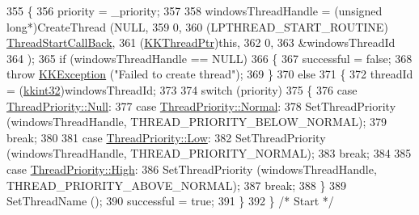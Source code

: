 \begin{DoxyCode}
355 \{
356   priority = \_priority;
357 
358   windowsThreadHandle = (\textcolor{keywordtype}{unsigned} \textcolor{keywordtype}{long}*)CreateThread (NULL,
359                                                 0,
360                                                 (LPTHREAD\_START\_ROUTINE)
      \hyperlink{namespace_k_k_b_ae794a520ad588629dcd5827773f4ff86}{ThreadStartCallBack},
361                                                 (\hyperlink{class_k_k_b_1_1_k_k_thread_ae0ca65f275a57c346e71486ad84b271a}{KKThreadPtr})\textcolor{keyword}{this},
362                                                 0,
363                                                 &windowsThreadId
364                                                );
365   \textcolor{keywordflow}{if}  (windowsThreadHandle == NULL)
366   \{
367     successful = \textcolor{keyword}{false};
368     \textcolor{keywordflow}{throw} \hyperlink{class_k_k_b_1_1_k_k_exception}{KKException} (\textcolor{stringliteral}{"Failed to create thread"});
369   \}
370   \textcolor{keywordflow}{else}
371   \{
372     threadId = (\hyperlink{namespace_k_k_b_a8fa4952cc84fda1de4bec1fbdd8d5b1b}{kkint32})windowsThreadId;
373 
374     \textcolor{keywordflow}{switch}  (priority)
375     \{
376     \textcolor{keywordflow}{case}  \hyperlink{class_k_k_b_1_1_k_k_thread_ad9b55cc20284bcadd051a20945325e0cabbb93ef26e3c101ff11cdd21cab08a94}{ThreadPriority::Null}:
377     \textcolor{keywordflow}{case}  \hyperlink{class_k_k_b_1_1_k_k_thread_ad9b55cc20284bcadd051a20945325e0ca960b44c579bc2f6818d2daaf9e4c16f0}{ThreadPriority::Normal}:
378       SetThreadPriority (windowsThreadHandle, THREAD\_PRIORITY\_BELOW\_NORMAL);
379       \textcolor{keywordflow}{break};
380 
381     \textcolor{keywordflow}{case}  \hyperlink{class_k_k_b_1_1_k_k_thread_ad9b55cc20284bcadd051a20945325e0ca28d0edd045e05cf5af64e35ae0c4c6ef}{ThreadPriority::Low}:
382       SetThreadPriority (windowsThreadHandle, THREAD\_PRIORITY\_NORMAL);
383       \textcolor{keywordflow}{break};
384 
385     \textcolor{keywordflow}{case}  \hyperlink{class_k_k_b_1_1_k_k_thread_ad9b55cc20284bcadd051a20945325e0ca655d20c1ca69519ca647684edbb2db35}{ThreadPriority::High}:
386       SetThreadPriority (windowsThreadHandle, THREAD\_PRIORITY\_ABOVE\_NORMAL);
387       \textcolor{keywordflow}{break};
388     \}
389     SetThreadName ();
390     successful = \textcolor{keyword}{true};
391   \}
392 \}  \textcolor{comment}{/* Start */}
\end{DoxyCode}

